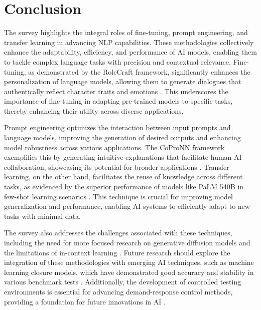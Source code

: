 \section{Conclusion} \label{sec:Conclusion}







The survey highlights the integral roles of fine-tuning, prompt engineering, and transfer learning in advancing NLP capabilities. These methodologies collectively enhance the adaptability, efficiency, and performance of AI models, enabling them to tackle complex language tasks with precision and contextual relevance. Fine-tuning, as demonstrated by the RoleCraft framework, significantly enhances the personalization of language models, allowing them to generate dialogues that authentically reflect character traits and emotions \cite{tao2024rolecraftglmadvancingpersonalizedroleplaying}. This underscores the importance of fine-tuning in adapting pre-trained models to specific tasks, thereby enhancing their utility across diverse applications.



Prompt engineering optimizes the interaction between input prompts and language models, improving the generation of desired outputs and enhancing model robustness across various applications. The CoProNN framework exemplifies this by generating intuitive explanations that facilitate human-AI collaboration, showcasing its potential for broader applications \cite{chiaburu2024copronnconceptbasedprototypicalnearest}. Transfer learning, on the other hand, facilitates the reuse of knowledge across different tasks, as evidenced by the superior performance of models like PaLM 540B in few-shot learning scenarios \cite{chowdhery2023palm}. This technique is crucial for improving model generalization and performance, enabling AI systems to efficiently adapt to new tasks with minimal data.



The survey also addresses the challenges associated with these techniques, including the need for more focused research on generative diffusion models and the limitations of in-context learning . Future research should explore the integration of these methodologies with emerging AI techniques, such as machine learning closure models, which have demonstrated good accuracy and stability in various benchmark tests \cite{huang2021machinelearningmomentclosure}. Additionally, the development of controlled testing environments is essential for advancing demand-response control methods, providing a foundation for future innovations in AI \cite{geller2023tunableexperimentaltestbedevaluating}.